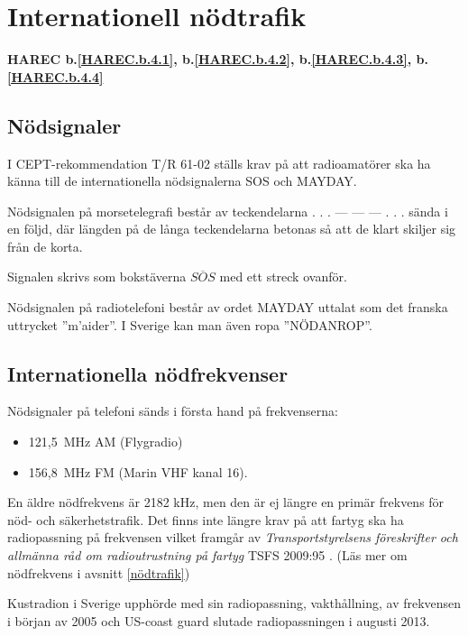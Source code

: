 \section{Internationell nödtrafik}
\textbf{
	HAREC b.\ref{HAREC.b.4.1}\label{myHAREC.b.4.1},
	b.\ref{HAREC.b.4.2}\label{myHAREC.b.4.2},
	b.\ref{HAREC.b.4.3}\label{myHAREC.b.4.3},
	b.\ref{HAREC.b.4.4}\label{myHAREC.b.4.4}
}

\subsection{Nödsignaler}

I CEPT-rekommendation T/R 61-02 \cite{TR6102} ställs krav på att radioamatörer
ska ha känna till de internationella nödsignalerna SOS och MAYDAY.

Nödsignalen på morsetelegrafi består av teckendelarna . . . --- --- --- . . .
sända i en följd, där längden på de långa teckendelarna betonas så att de klart
skiljer sig från de korta.

Signalen skrivs som bokstäverna $\overline{SOS}$ med ett streck ovanför.

Nödsignalen på radiotelefoni består av ordet MAYDAY uttalat som det franska
uttrycket ''m'aider''. I Sverige kan man även ropa ''NÖDANROP''.

\subsection{Internationella nödfrekvenser}

Nödsignaler på telefoni sänds i första hand på frekvenserna:
\begin{itemize}
	\item 121,5~MHz AM (Flygradio)
	\item 156,8~MHz FM (Marin VHF kanal 16).
\end{itemize}

En äldre nödfrekvens är 2182 kHz, men den är ej längre en primär frekvens för
nöd- och säkerhetstrafik.
Det finns inte längre krav på att fartyg ska ha radiopassning på frekvensen
vilket framgår av \emph{Transportstyrelsens föreskrifter och allmänna råd
	om radioutrustning på fartyg} TSFS 2009:95 \cite[\S22]{TSFS2009:95}.
(Läs mer om nödfrekvens i avsnitt \ref{nödtrafik})

Kustradion i Sverige upphörde med sin radiopassning, vakthållning, av frekvensen
i början av 2005 och US-coast guard slutade radiopassningen i augusti 2013.


